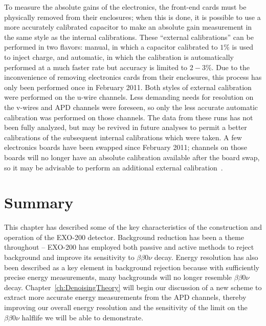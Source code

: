 To measure the absolute gains of the electronics, the front-end cards must be physically removed from their enclosures; when this is done, it is possible to use a more accurately calibrated capacitor to make an absolute gain measurement in the same style as the internal calibrations.  These ``external calibrations'' can be performed in two flavors: manual, in which a capacitor calibrated to $1\%$ is used to inject charge, and automatic, in which the calibration is automatically performed at a much faster rate but accuracy is limited to $2-3\%$.  Due to the inconvenience of removing electronics cards from their enclosures, this process has only been performed once in February 2011.  Both styles of external calibration were performed on the u-wire channels.  Less demanding needs for resolution on the v-wires and APD channels were foreseen, so only the less accurate automatic calibration was performed on those channels.  The data from these runs has not been fully analyzed, but may be revived in future analyses to permit a better calibrations of the subsequent internal calibrations which were taken.  A few electronics boards have been swapped since February 2011; channels on those boards will no longer have an absolute calibration available after the board swap, so it may be advisable to perform an additional external calibration~\cite{EnergyDocumentRun2a}.

\section{Summary}

This chapter has described some of the key characteristics of the construction and operation of the EXO-200 detector.  Background reduction has been a theme throughout -- EXO-200 has employed both passive and active methods to reject background and improve its sensitivity to $\beta\beta 0\nu$ decay.  Energy resolution has also been described as a key element in background rejection because with sufficiently precise energy measurements, many backgrounds will no longer resemble $\beta\beta 0\nu$ decay.  Chapter~\ref{ch:DenoisingTheory} will begin our discussion of a new scheme to extract more accurate energy measurements from the APD channels, thereby improving our overall energy resolution and the sensitivity of the limit on the $\beta\beta 0\nu$ halflife we will be able to demonstrate.
